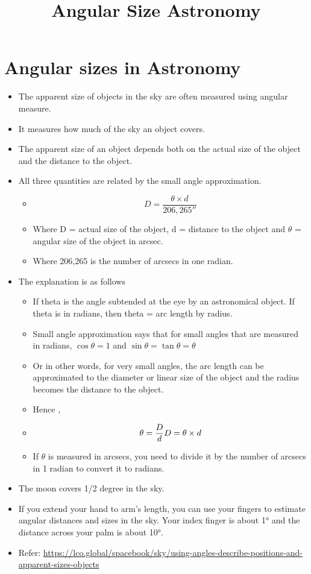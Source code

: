 \documentclass{../template/texnote}
\title{Angular Size Astronomy}
\begin{document}
    \maketitle {}
\section{Angular sizes in Astronomy}\label{angular-sizes-in-astronomy}

\begin{itemize}
\item
  The apparent size of objects in the sky are often measured using
  angular measure.
\item
  It measures how much of the sky an object covers.
\item
  The apparent size of an object depends both on the actual size of the
  object and the distance to the object.
\item
  All three quantities are related by the small angle approximation.

  \begin{itemize}
  \item
    \[D = \frac{\theta \times d }{206,265''}\]
  \item
    Where D = actual size of the object, d = distance to the object and
    \(\theta\) = angular size of the object in arcsec.
  \item
    Where 206,265 is the number of arcsecs in one radian.
  \end{itemize}
\item
  The explanation is as follows

  \begin{itemize}
  \item
    If theta is the angle subtended at the eye by an astronomical
    object. If theta is in radians, then theta = arc length by radius.
  \item
    Small angle approximation says that for small angles that are
    measured in radians, $\cos \theta = 1$ and $\sin \theta =  \tan \theta = \theta$
  \item
    Or in other words, for very small angles, the arc length can be
    approximated to the diameter or linear size of the object and the
    radius becomes the distance to the object.
  \item
    Hence ,
  \item
    \[\theta = \frac{D}{d} \\
      D = \theta \times d \]
  \item
    If \(\theta\) is measured in arcsecs, you need to divide it by the
    number of arcsecs in 1 radian to convert it to radians.
  \end{itemize}
\item
  The moon covers 1/2 degree in the sky.
\item
  If you extend your hand to arm's length, you can use your fingers to
  estimate angular distances and sizes in the sky. Your index finger is
  about 1° and the distance across your palm is about 10°.
\item
  Refer:
  \url{https://lco.global/spacebook/sky/using-angles-describe-positions-and-apparent-sizes-objects}
\end{itemize}
    \printbibliography
\end{document}
